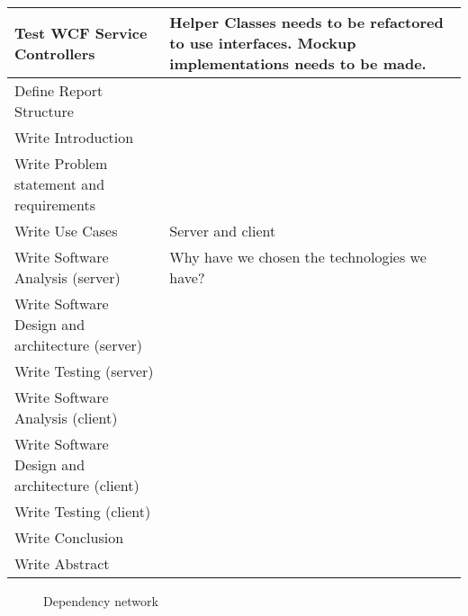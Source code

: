 \begin{longtable}{|p{200px}|p{200px}|}
	Test WCF Service Controllers & Helper Classes needs to be refactored to use interfaces. Mockup implementations needs to be made. \\ \hline
	Define Report Structure & ~  \\ \hline
	Write Introduction & ~  \\ \hline
	Write Problem statement and requirements & ~  \\ \hline
	Write Use Cases & Server and client  \\ \hline
	Write Software Analysis (server) & Why have we chosen the technologies we have? \\ \hline
	Write Software Design and architecture (server) & ~  \\ \hline
	Write Testing (server) & ~  \\ \hline
	Write Software Analysis (client) & ~  \\ \hline
	Write Software Design and architecture (client) & ~  \\ \hline
	Write Testing (client) & ~  \\ \hline
	Write Conclusion & ~  \\ \hline
	Write Abstract & ~  \\ \hline
\end{longtable}
\newpage

\begin{landscape}
\begin{figure}[H]
  
  \caption{Dependency network}
  \label{dependency_network}
\end{figure}
\end{landscape}

\newpage
\renewcommand{\section}[2]{} %